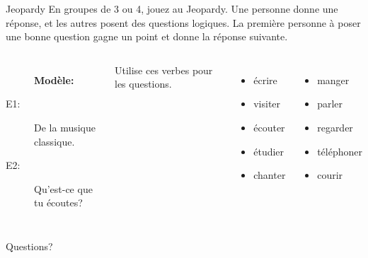 \documentclass{beamer}
\begin{document}
  \begin{frame}{Jeopardy}
    \small
    En groupes de 3 ou 4, jouez au Jeopardy.
    Une personne donne une réponse, et les autres posent des questions logiques.
    La première personne à poser une bonne question gagne un point et donne la réponse suivante.
    \begin{columns}
        \begin{description}
          \item[] \textbf{Modèle:}
          \item[E1:] De la musique classique.
          \item[E2:] Qu'est-ce que tu écoutes?
        \end{description}
        \begin{center}
          Utilise ces verbes pour les questions.
        \end{center}
        \begin{columns}
            \begin{itemize}
              \item écrire
              \item visiter
              \item écouter
              \item étudier
              \item chanter
            \end{itemize}
            \begin{itemize}
              \item manger
              \item parler
              \item regarder
              \item téléphoner
              \item courir
            \end{itemize}
        \end{columns}
    \end{columns}
  \end{frame}

  \begin{frame}{}
    \begin{center}
      \Large Questions?
    \end{center}
  \end{frame}
\end{document}
